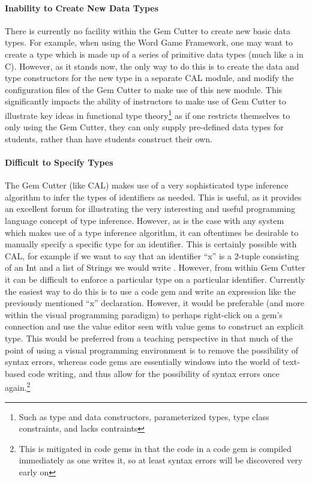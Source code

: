 \paragraph{Inability to Create New Data Types}

There is currently no facility within the Gem Cutter to create new basic data types.  For example, when using the Word Game Framework, one may want to create a  type which is made up of a series of primitive data types (much like a  in C).  However, as it stands now, the only way to do this is to create the data and type constructors for the new type in a separate CAL module, and modify the configuration files of the Gem Cutter to make use of this new module.  This significantly impacts the ability of instructors to make use of Gem Cutter to illustrate key ideas in functional type theory\footnote{Such as type and data constructors, parameterized types, type class constraints, and lacks contraints} as if one restricts themselves to only using the Gem Cutter, they can only supply pre-defined data types for students, rather than have students construct their own.

\paragraph{Difficult to Specify Types}

The Gem Cutter (like CAL) makes use of a very sophisticated type inference algorithm to infer the types of identifiers as needed.  This is useful, as it provides an excellent forum for illustrating the very interesting and useful programming language concept of type inference.  However, as is the case with any system which makes use of a type inference algorithm, it can oftentimes be desirable to manually specify a specific type for an identifier.  This is certainly possible with CAL, for example if we want to say that an identifier ``x'' is a 2-tuple consisting of an Int and a list of Strings we would write .  However, from within Gem Cutter it can be difficult to enforce a particular type on a particular identifier.  Currently the easiest way to do this is to use a code gem and write an expression like the previously mentioned ``x'' declaration.  However, it would be preferable (and more within the visual programming paradigm) to perhaps right-click on a gem's connection and use the value editor seen with value gems to construct an explicit type.  This would be preferred from a teaching perspective in that much of the point of using a visual programming environment is to remove the possibility of syntax errors, whereas code gems are essentially windows into the world of text-based code writing, and thus allow for the possibility of syntax errors once again.\footnote{This is mitigated in code gems in that the code in a code gem is compiled immediately as one writes it, so at least syntax errors will be discovered very early on}

